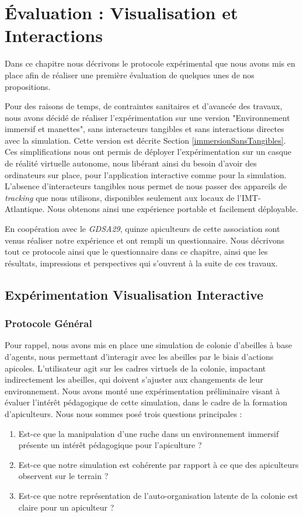 \chapter{Évaluation : Visualisation et Interactions}

	Dans ce chapitre nous décrivons le protocole expérimental que nous avons mis en place afin de réaliser une première évaluation de quelques unes de nos propositions.
	
	Pour des raisons de temps, de contraintes sanitaires et d'avancée des travaux, nous avons décidé de réaliser l'expérimentation sur une version "Environnement immersif et manettes", sans interacteurs tangibles et sans interactions directes avec la simulation. Cette version est décrite Section \ref{immersionSansTangibles}. Ces simplifications nous ont permis de déployer l'expérimentation sur un casque de réalité virtuelle autonome, nous libérant ainsi du besoin d'avoir des ordinateurs sur place, pour l'application interactive comme pour la simulation. L'absence d'interacteurs tangibles nous permet de nous passer des appareils de \textit{tracking} que nous utilisons, disponibles seulement aux locaux de l'IMT-Atlantique. Nous obtenons ainsi une expérience portable et facilement déployable.
	
	En coopération avec le \textit{GDSA29}, quinze apiculteurs de cette association sont venus réaliser notre expérience et ont rempli un questionnaire. Nous décrivons tout ce protocole ainsi que le questionnaire dans ce chapitre, ainsi que les résultats, impressions et perspectives qui s'ouvrent à la suite de ces travaux.

	\section{Expérimentation Visualisation Interactive}
		\label{sectionExpe}
		
		\subsection{Protocole Général}
		\label{protocoleGeneral}
		Pour rappel, nous avons mis en place une simulation de colonie d'abeilles à base d'agents, nous permettant d'interagir avec les abeilles par le biais d'actions apicoles. L'utilisateur agit sur les cadres virtuels de la colonie, impactant indirectement les abeilles, qui doivent s'ajuster aux changements de leur environnement. Nous avons monté une expérimentation préliminaire visant à évaluer l'intérêt pédagogique de cette simulation, dans le cadre de la formation d'apiculteurs. Nous nous sommes posé trois questions principales :
		\begin{enumerate}
			\item Est-ce que la manipulation d'une ruche dans un environnement immersif présente un intérêt pédagogique pour l'apiculture ?
			\item Est-ce que notre simulation est cohérente par rapport à ce que des apiculteurs observent sur le terrain ?
			\item Est-ce que notre représentation de l'auto-organisation latente de la colonie est claire pour un apiculteur ?
		\end{enumerate}

